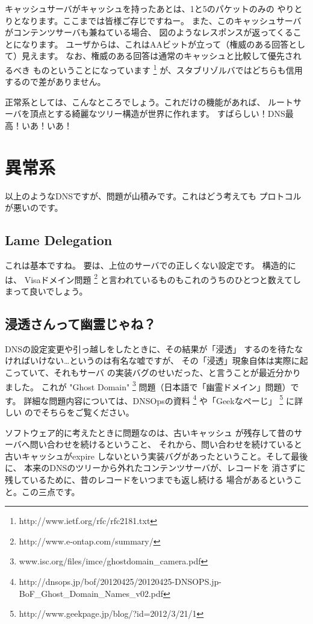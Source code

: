 キャッシュサーバがキャッシュを持ったあとは、1と5のパケットのみの
やりとりとなります。ここまでは皆様ご存じですねー。
また、このキャッシュサーバがコンテンツサーバも兼ねている場合、
図のようなレスポンスが返ってくることになります。
ユーザからは、これはAAビットが立って（権威のある回答として）見えます。
なお、権威のある回答は通常のキャッシュと比較して優先されるべき
ものということになっています
\footnote{http://www.ietf.org/rfc/rfc2181.txt}
が、スタブリゾルバではどちらも信用するので差がありません。

正常系としては、こんなところでしょう。これだけの機能があれば、
ルートサーバを頂点とする綺麗なツリー構造が世界に作れます。
すばらしい！DNS最高！いあ！いあ！


\section { 異常系 }
以上のようなDNSですが、問題が山積みです。これはどう考えても
プロトコルが悪いのです。

\subsection{ Lame Delegation }
これは基本ですね。 要は、上位のサーバでの正しくない設定です。
構造的には、 Visaドメイン問題 
\footnote{http://www.e-ontap.com/summary/}
と言われているものもこれのうちのひとつと数えてしまって良いでしょう。


\subsection{ 浸透さんって幽霊じゃね？ }

DNSの設定変更や引っ越しをしたときに、その結果が「浸透」
するのを待たなければいけない…というのは有名な嘘ですが、
その「浸透」現象自体は実際に起こっていて、それもサーバ
の実装バグのせいだった、と言うことが最近分かりました。
これが "Ghost Domain" 
\footnote{www.isc.org/files/imce/ghostdomain\_camera.pdf}
問題（日本語で「幽霊ドメイン」問題）です。 
詳細な問題内容については、DNSOpsの資料 
\footnote{http://dnsops.jp/bof/20120425/20120425-DNSOPS.jp-BoF\_Ghost\_Domain\_Names\_v02.pdf}
や「Geekなぺーじ」
\footnote{http://www.geekpage.jp/blog/?id=2012/3/21/1} に詳しい
のでそちらをご覧ください。

ソフトウェア的に考えたときに問題なのは、古いキャッシュ
が残存して昔のサーバへ問い合わせを続けるということ、
それから、問い合わせを続けていると古いキャッシュがexpire
しないという実装バグがあったということ。そして最後に、
本来のDNSのツリーから外れたコンテンツサーバが、レコードを
消さずに残しているために、昔のレコードをいつまでも返し続ける
場合があるということ。この三点です。

